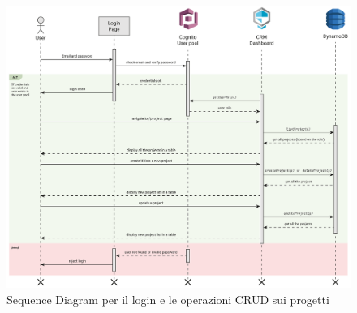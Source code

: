 \documentclass[target=bach,aauheader=,style=]{thud}
\begin{document}
\begin{figure}[H]
    \centering
    \includegraphics[width=1\textwidth]{img/diagrammi/sequence.pdf} 
    \caption{Sequence Diagram per il login e le operazioni CRUD sui progetti}
\end{figure}





\end{document}

